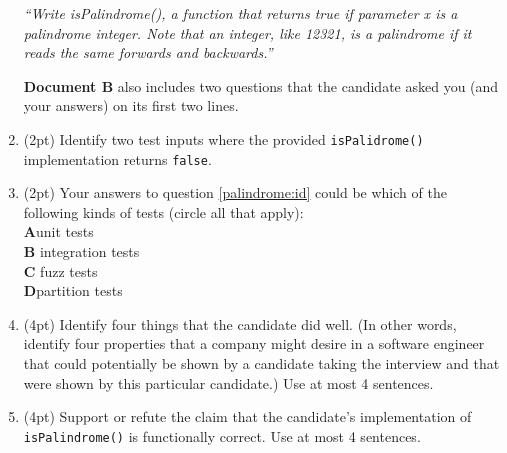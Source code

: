 \documentclass{report}
\newif\ifkey
\newcommand{\correct}[1]{\ifkey\color{red}\textbf{#1}\color{black}\else\textbf{#1}\fi\xspace}
\newcommand{\answerlong}[1]{\ifkey\color{red}\textbf{#1}\color{black}\else\vspace{0.5in}\fi\xspace}
\newcommand*{\pts}[1]{\addtocounter{points}{#1}(#1pt)}
\begin{document}
\begin{spacing}{1.4}
\begin{enumerate}[leftmargin=*]
    \emph{
      ``Write isPalindrome(), a function that
      returns true if parameter x is a palindrome integer. Note that an integer, like 12321, is a palindrome if it reads the same
      forwards and backwards.''
    }
      
    \textbf{Document B} also includes two questions that the candidate asked you (and your answers) on its first two lines.

  \item \label{palindrome:id} \pts{2} Identify two test inputs where the provided \lstinline{isPalidrome()} implementation returns \lstinline{false}.\\
    \answerlong{Answers will vary. Student solutions must not be a palindrome. {{123}}, {{10}} are potential answers that return
      false.}

  \item \pts{2} Your answers to question \ref{palindrome:id} could be which of the following kinds of tests (circle all that apply):
    \\ \correct{A}\hspace{0.2in}unit tests
    \\ \textbf{B}\hspace{0.2in} integration tests
    \\ \textbf{C}\hspace{0.2in} fuzz tests
    \\ \correct{D}\hspace{0.2in}partition tests

  \item \pts{4}  Identify four things that the candidate did well. (In other words, identify four properties that a company might
desire in a software engineer that could potentially be shown by a candidate taking the interview and that were shown by this
particular candidate.) Use at most 4 sentences.\\
\answerlong{Answers will vary. Potential solutions include the following:
1. The candidate provided inline comments explaining some of their code.
2. The candidate asked relevant questions regarding code functionality.
3. The candidate has consistent indentation.
4. The candidate used a descriptive variable name.}

\item \pts{4} Support or refute the claim that the candidate's implementation of \lstinline{isPalindrome()} is functionally correct. Use
  at most 4 sentences.\\
  \answerlong{Refute. The candidate's implementation of isPalindrome() is not functionally correct. The candidate missed a base
case regarding x being a negative number. Negative integers would not count as a palindrome. {-313} reversed is {313-}.}
    

\end{enumerate}
\end{spacing}
\end{document}
